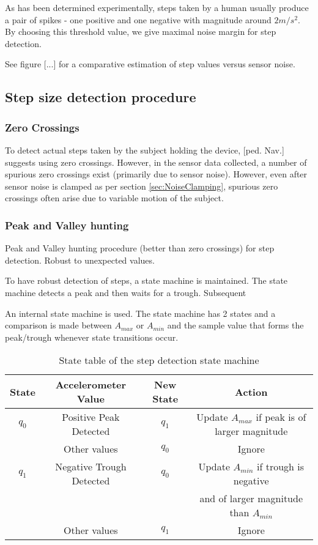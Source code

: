 As has been determined experimentally, steps taken by a human usually produce
a pair of spikes - one positive and one negative with magnitude around $2 m/s^2$.
By choosing this threshold value, we give maximal noise margin for step detection.

See figure [...] for a comparative estimation of step values versus sensor noise.

\subsection{Step size detection procedure}

\subsubsection{Zero Crossings}

To detect actual steps taken by the subject holding the device, [ped. Nav.] 
suggests using zero crossings. However, in the sensor data collected, a number
of spurious zero crossings exist (primarily due to sensor noise). However, 
even after sensor noise is clamped as per section \ref{sec:NoiseClamping}, 
spurious zero crossings often arise due to variable motion of the subject.

\subsubsection{Peak and Valley hunting}
Peak and Valley hunting procedure (better than zero crossings) for step detection.
Robust to unexpected values.

To have robust detection of steps, a state machine is maintained. The state 
machine detects a peak and then waits for a trough. Subsequent

An internal state machine is used. The state machine has 2 states and a comparison
is made between $A_{max}$ or $A_{min}$ and the sample value that forms the peak/trough
whenever state transitions occur.

\begin{table}[h]\centering
    \caption{State table of the step detection state machine}
    \begin{tabular}{cccc} \hline
    State & Accelerometer Value     & New State &  Action\\     \hline
    $q_0$ & Positive Peak Detected  & $q_1$     & Update $A_{max}$ if peak is of larger magnitude \\
          & Other values            & $q_0$     & Ignore \\         \hline
    $q_1$ & Negative Trough Detected & $q_0$    & Update $A_{min}$ if trough is negative \\ 
          &                         &           & and of larger magnitude than $A_{min}$ \\
          & Other values            & $q_1$     & Ignore \\ \hline
    \end{tabular}
\end{table}
